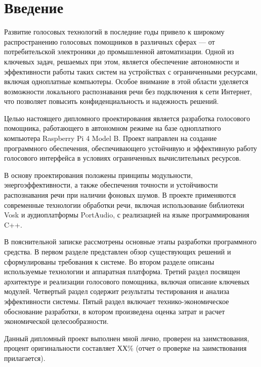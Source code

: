 
\section*{Введение}


Развитие голосовых технологий в последние годы привело к широкому распространению голосовых помощников в различных сферах — от потребительской электроники до промышленной автоматизации. Одной из ключевых задач, решаемых при этом, является обеспечение автономности и эффективности работы таких систем на устройствах с ограниченными ресурсами, включая одноплатные компьютеры. Особое внимание в этой области уделяется возможности локального распознавания речи без подключения к сети Интернет, что позволяет повысить конфиденциальность и надежность решений.

Целью настоящего дипломного проектирования является разработка голосового помощника, работающего в автономном режиме на базе одноплатного компьютера Raspberry Pi 4 Model B. Проект направлен на создание программного обеспечения, обеспечивающего устойчивую и эффективную работу голосового интерфейса в условиях ограниченных вычислительных ресурсов.

В основу проектирования положены принципы модульности, энергоэффективности, а также обеспечения точности и устойчивости распознавания речи при наличии фоновых шумов. В проекте применяются современные технологии обработки речи, включая использование библиотеки Vosk и аудиоплатформы PortAudio, с реализацией на языке программирования C++.

В пояснительной записке рассмотрены основные этапы разработки программного средства. В первом разделе представлен обзор существующих решений и сформулированы требования к системе. Во втором разделе описаны используемые технологии и аппаратная платформа. Третий раздел посвящен архитектуре и реализации голосового помощника, включая описание ключевых модулей. Четвертый раздел содержит результаты тестирования и анализа эффективности системы. Пятый раздел включает технико-экономическое обоснование разработки, в котором произведена оценка затрат и расчет экономической целесообразности.

Данный дипломный проект выполнен мной лично, проверен на заимствования, процент оригинальности составляет ХХ\% (отчет о проверке на заимствования прилагается).

\newpage
